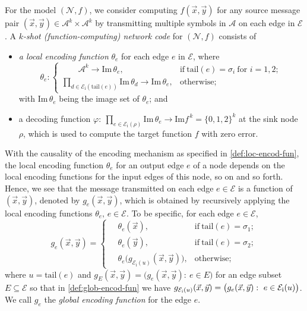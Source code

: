 \documentclass[11pt,draftclsnofoot,onecolumn]{IEEEtran}
\newcommand{\ein}{\mathcal{E}_{\mathrm{i}}}
\newcommand{\mA}{\mathcal{A}}
\newcommand{\mE}{\mathcal{E}}
\def\Im{\mathrm{Im}}
\begin{document}
{For the model $(\mathcal{N},f)$, we consider computing $f(\vec{x},\vec{y})$ for any source message pair $(\vec{x},\vec{y})\in\mA^{k}\times\mA^{k}$ by transmitting multiple symbols in $\mA$ on each edge in $\mE$. A \emph{$k$-shot (function-computing) network code} for $(\mathcal{N},f)$  consists of
\begin{itemize}
\item {\em a local encoding function} $\theta_{e}$ for each edge $e$ in $\mE$, where
\begin{equation}
  \theta_{e}:
  \begin{cases}
    \qquad \mA^k \rightarrow \Im\,\theta_e, & \text{if}~\mathrm{tail}(e)=\sigma_{i}~\text{for  $i=1,2$}; \\
    \prod\limits_{d\in \ein(\mathrm{tail}(e))} \Im\,\theta_d \rightarrow
    \Im\,\theta_e, & \text{otherwise;}
  \end{cases}\label{def:loc-encod-fun}
\end{equation}
with $\Im\,\theta_e$ being the image set of $\theta_e$;
and
 \item a decoding function  $\varphi:~\prod_{e\in \ein(\rho)} \Im\,\theta_e \rightarrow \Im f^{\,k}=\{0,1,2\}^k$ at the sink node $\rho$, which is used  to compute the target function $f$ with zero error.
\end{itemize}
With the causality of the encoding mechanism as specified in \eqref{def:loc-encod-fun}, the local encoding function $\theta_{e}$ for an output edge $e$ of a node depends  on the local encoding functions for the input edges of this node, so on and so forth.
Hence, we see that the message transmitted on each edge $e\in\mathcal{E}$ is a function of $(\vec{x},\vec{y})$, denoted by $g_{e}(\vec{x},\vec{y})$, which is obtained by recursively applying the local encoding
functions $\theta_{e},\,e\in\mathcal{E}$. To be specific, for each edge $e\in\mathcal{E}$,
\begin{equation}
  g_{e}(\vec{x},\vec{y})=
  \begin{cases}
    \quad \theta_{e}(\vec{x}), & \text{if}~\mathrm{tail}(e)=\sigma_{1}; \\
    \quad \theta_{e}(\vec{y}), & \text{if}~\mathrm{tail}(e)=\sigma_{2}; \\
    \quad\theta_{e}\big(g_{\mathcal{E}_{\text{i}}(u)}(\vec{x},\vec{y})\big), & \text{otherwise;}
  \end{cases}\label{def:glob-encod-fun}
\end{equation}
where $u=\text{tail}(e)$ and $g_{E}(\vec{x},\vec{y}) = \big(g_{e}(\vec{x},\vec{y}):~e\in E \big)$ for an edge subset $E\subseteq\mathcal{E}$ so that in \eqref{def:glob-encod-fun} we have $g_{\mathcal{E}_{\text{i}}(u)}(\vec{x},\vec{y})=\big(g_{e}(\vec{x},\vec{y}):~e\in\mathcal{E}_{{\rm i}}(u)\big)$. We call $g_{e}$ the \emph{global encoding function} for the edge $e$.
}
\end{document}
